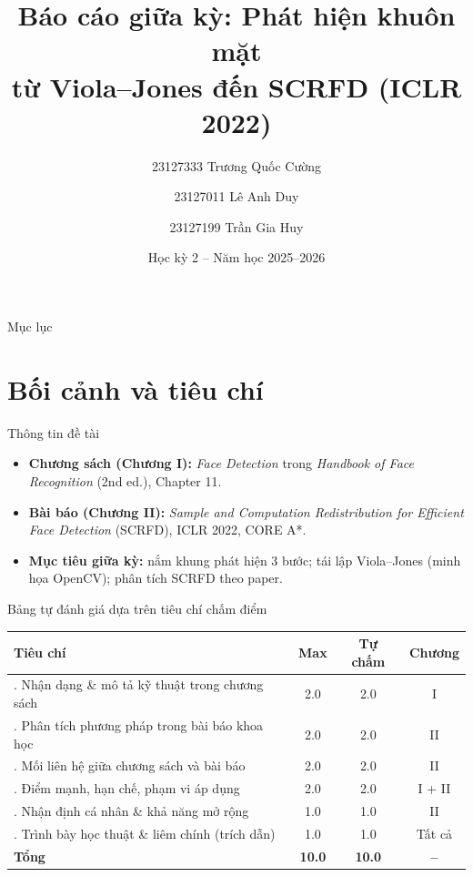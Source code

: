 \documentclass[aspectratio=169,11pt]{beamer}
\title[Midterm -- Nhận dạng]{Báo cáo giữa kỳ: Phát hiện khuôn mặt\\từ Viola--Jones đến SCRFD (ICLR 2022)}
\author[Nhóm 23KHMT]{23127333 Trương Quốc Cường \and 23127011 Lê Anh Duy \and 23127199 Trần Gia Huy}
\institute[HCMUS]{CSC14006 -- Nhận dạng\\Trường ĐH Khoa học Tự nhiên, ĐHQG-HCM}
\date[HK2 2025--2026]{Học kỳ 2 -- Năm học 2025--2026}
\begin{document}
\begin{frame}
  \titlepage
\end{frame}

\begin{frame}{Mục lục}
  \tableofcontents
\end{frame}

\section{Bối cảnh và tiêu chí}

\begin{frame}{Thông tin đề tài}
  \begin{itemize}
    \setlength{\itemsep}{4pt}
    \item \textbf{Chương sách (Chương I):} \textit{Face Detection} trong \textit{Handbook of Face Recognition} (2nd ed.), Chapter 11.\ \cite{li2012facechapter}
    \item \textbf{Bài báo (Chương II):} \textit{Sample and Computation Redistribution for Efficient Face Detection} (SCRFD), ICLR 2022, CORE A*.\ \cite{guo2022scrfd}
    \item \textbf{Mục tiêu giữa kỳ:} nắm khung phát hiện 3 bước; tái lập Viola--Jones (minh họa OpenCV); phân tích SCRFD theo paper.
  \end{itemize}
\end{frame}

\begin{frame}{Bảng tự đánh giá dựa trên tiêu chí chấm điểm}
  \small
  \setlength{\tabcolsep}{5pt}
  \renewcommand{\arraystretch}{1.15}
  \begin{tabular}{@{}>{\raggedright\arraybackslash}p{}ccc@{}}
    \toprule
    \textbf{Tiêu chí} & \textbf{Max} & \textbf{Tự chấm} & \textbf{Chương} \\
    \midrule
    1. Nhận dạng \& mô tả kỹ thuật trong chương sách & 2.0 & 2.0 & I \\
    2. Phân tích phương pháp trong bài báo khoa học & 2.0 & 2.0 & II \\
    3. Mối liên hệ giữa chương sách và bài báo & 2.0 & 2.0 & II \\
    4. Điểm mạnh, hạn chế, phạm vi áp dụng & 2.0 & 2.0 & I + II \\
    5. Nhận định cá nhân \& khả năng mở rộng & 1.0 & 1.0 & II \\
    6. Trình bày học thuật \& liêm chính (trích dẫn) & 1.0 & 1.0 & Tất cả \\
    \midrule
    \textbf{Tổng} & \textbf{10.0} & \textbf{10.0} & \textbf{--} \\
    \bottomrule
  \end{tabular}
\end{frame}
\end{document}
